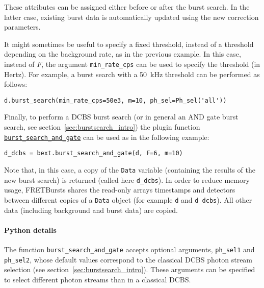 These attributes can be assigned either before or after the burst search. In the
latter case, existing burst data is automatically updated using the new
correction parameters.

It might sometimes be useful to specify a fixed threshold, instead
of a threshold depending on the background rate, as in the previous example. In
this case, instead of $F$, the argument \verb|min_rate_cps| can be used to
specify the threshold (in Hertz). For example, a burst search with a 50~kHz
threshold can be performed as follows:

\begin{verbatim}
d.burst_search(min_rate_cps=50e3, m=10, ph_sel=Ph_sel('all'))
\end{verbatim}

Finally, to perform a DCBS burst search (or in general an AND gate burst search,
see section~\ref{sec:burstsearch_intro}) the plugin function
\href{http://fretbursts.readthedocs.org/en/latest/plugins.html#fretbursts.burstlib\_ext.burst\_search\_and\_gate}{\texttt{burst\_search\_and\_gate}}
can be used as in the following example:

\begin{verbatim}
d_dcbs = bext.burst_search_and_gate(d, F=6, m=10)
\end{verbatim}

Note that, in this case, a copy of the \verb|Data| variable (containing the results
of the new burst search) is returned (called here \verb|d_dcbs|).
In order to
reduce memory usage, FRETBursts shares the read-only arrays timestamps and detectors between
different copies of a \verb|Data| object (for example \verb|d| and
\verb|d_dcbs|).
All other data (including background and burst data) are copied.


\paragraph{Python details}
The function \verb|burst_search_and_gate| accepts optional arguments,
\verb|ph_sel1| and \verb|ph_sel2|, whose default values correspond to the
classical DCBS photon stream selection (see section~\ref{sec:burstsearch_intro}).
These arguments can be specified to select different photon streams than in
a classical DCBS.


